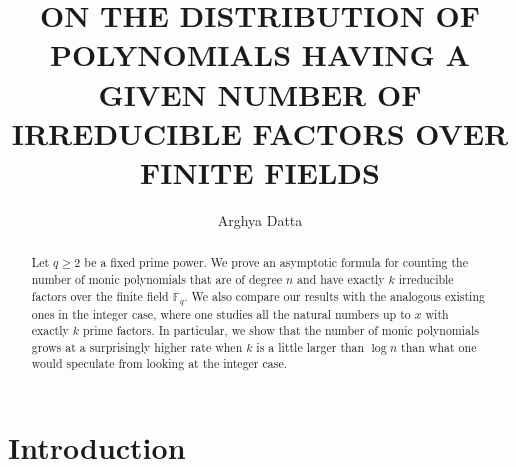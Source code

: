 \documentclass[12pt]{amsart}
\numberwithin{equation}{section}
\theoremstyle{remark}
\theoremstyle{remark}
\theoremstyle{definition}
\begin{document}
\title[POLYNOMIALS WITH A GIVEN NUMBER OF IRREDUCIBLE FACTORS]{ON THE DISTRIBUTION OF POLYNOMIALS HAVING A GIVEN NUMBER OF IRREDUCIBLE FACTORS OVER FINITE FIELDS}
\author[Arghya Datta]{Arghya Datta}
\address{D\'epartement de math\'ematiques et de statistique\\
Universit\'e de Montr\'eal\\CP 6192 Succ. Centre-ville, Montr\'eal, QC H3C 3J7, Canada}

\date{}
\begin{abstract}
Let $q\geqslant 2$ be a fixed prime power. We prove an asymptotic formula for counting the number of monic polynomials that are of degree $n$ and have exactly $k$ irreducible factors over the finite field $\mathbb{F}_q$. We also compare our results with the analogous existing ones in the integer case, where one studies all the natural numbers up to $x$ with exactly $k$ prime factors. In particular, we show that the number of monic polynomials grows at a surprisingly higher rate when $k$ is a little larger than $\log n$ than what one would speculate from looking at the integer case. 
\end{abstract}


\maketitle


\section{Introduction}
\end{document}
